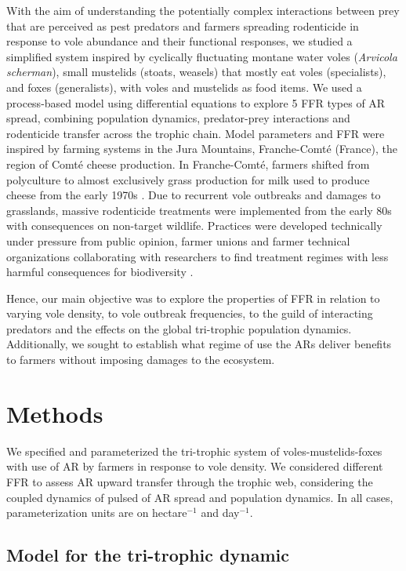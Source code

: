 \documentclass[11pt]{article}
\begin{document}
With the aim of understanding the potentially complex interactions between prey that are perceived as pest predators and farmers spreading rodenticide in response to vole abundance and their functional responses, we studied a simplified system inspired by cyclically fluctuating montane water voles (\textit{Arvicola scherman}), small mustelids (stoats, weasels) that mostly eat voles (specialists), and foxes (generalists), with voles and mustelids as food items. We used a process-based model using differential equations to explore 5 FFR types of AR spread, combining population dynamics, predator-prey interactions and rodenticide transfer across the trophic chain. Model parameters and FFR were inspired by farming systems in the Jura Mountains, Franche-Comté (France), the region of Comté cheese production. In Franche-Comté, farmers shifted from polyculture to almost exclusively grass production for milk used to produce cheese from the early 1970s \citep{Giraudoux1997}. Due to recurrent vole outbreaks and damages to grasslands, massive rodenticide treatments were implemented from the early 80s with consequences on non-target wildlife. Practices were developed technically under pressure from public opinion, farmer unions and farmer technical organizations collaborating with researchers to find treatment regimes with less harmful consequences for biodiversity \citep{Delattre2009}. 

Hence, our main objective was to explore the properties of FFR in relation to varying vole density, to vole outbreak frequencies, to the guild of interacting predators and the effects on the global tri-trophic population dynamics. Additionally, we sought to establish what regime of use the ARs deliver benefits to farmers without imposing damages to the ecosystem. 

\section{Methods}

We specified and parameterized the tri-trophic system of voles-mustelids-foxes with use of AR by farmers in response to vole density. We considered different FFR to assess AR upward transfer through the trophic web, considering the coupled dynamics of pulsed of AR spread and population dynamics. In all cases, parameterization units are on hectare$^{-1}$ and day$^{-1}$.

\subsection{Model for the tri-trophic dynamic}
\end{document}
